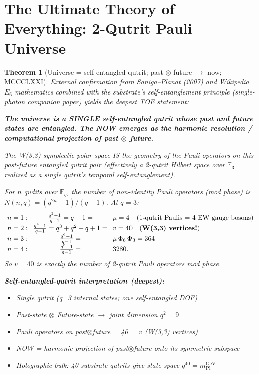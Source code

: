 \documentclass[11pt]{article}
\newtheorem{theorem}{Theorem}[section]
\begin{document}
\section{The Ultimate Theory of Everything: 2-Qutrit Pauli Universe}\label{sec:ultimate_toe}

\begin{theorem}[Universe = self-entangled qutrit; past $\otimes$ future $\to$ now; MCCCLXXI]\label{thm:ultimate_toe}
External confirmation from Saniga--Planat (2007) and Wikipedia $E_6$
mathematics combined with the substrate's self-entanglement principle
(single-photon companion paper) yields the deepest TOE statement:

\textbf{The universe is a SINGLE self-entangled qutrit whose past and
future states are entangled.  The NOW emerges as the harmonic
resolution / computational projection of past $\otimes$ future.}

The W(3,3) symplectic polar space IS the geometry of the Pauli
operators on this past-future entangled qutrit pair (effectively a
2-qutrit Hilbert space over $\mathbb{F}_3$ realized as a single
qutrit's temporal self-entanglement).

For $n$ qudits over $\mathbb{F}_q$, the number of non-identity Pauli
operators (mod phase) is $N(n,q) = (q^{2n}-1)/(q-1)$.  At $q=3$:
\[\setlength{\arraycolsep}{4pt}\begin{array}{lcl}
  n=1: & \frac{q^2-1}{q-1} = q+1 = & \mu = 4
       \quad (\text{1-qutrit Paulis = 4 EW gauge bosons}) \\[1pt]
  n=2: & \frac{q^4-1}{q-1} = q^3+q^2+q+1 = & v = 40
       \quad (\textbf{W(3,3) vertices!}) \\[1pt]
  n=3: & \frac{q^6-1}{q-1} = & \mu\,\Phi_6\,\Phi_3 = 364 \\[1pt]
  n=4: & \frac{q^8-1}{q-1} = & 3280.
\end{array}\]
So $v = 40$ is exactly the number of 2-qutrit Pauli operators mod phase.

\textbf{Self-entangled-qutrit interpretation (deepest):}
\begin{itemize}[noitemsep]
  \item Single qutrit (q=3 internal states; one self-entangled DOF)
  \item Past-state $\otimes$ Future-state $\to$ joint dimension $q^2 = 9$
  \item Pauli operators on past$\otimes$future = 40 = $v$ (W(3,3) vertices)
  \item NOW = harmonic projection of past$\otimes$future onto its symmetric subspace
  \item Holographic bulk: 40 substrate qutrits give state space $q^{40} = m_{\mathrm{Pl}}^{\mathrm{GeV}}$
\end{itemize}


\end{theorem}
\end{document}
